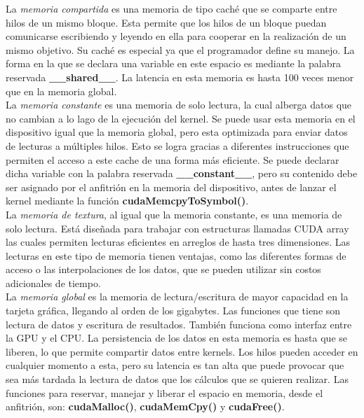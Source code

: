 La \textit{memoria compartida} es una memoria de tipo caché que se comparte entre hilos de un mismo bloque. Esta permite que los hilos de un bloque puedan comunicarse escribiendo y leyendo en ella para cooperar en la realización de un mismo objetivo. Su caché es especial ya que el programador define su manejo. La forma en la que se declara una variable en este espacio es mediante la palabra reservada \textbf{\_\_shared\_\_}. La latencia en esta memoria es hasta 100 veces menor que en la memoria global.\\
La \textit{memoria constante} es una memoria de solo lectura, la cual alberga datos que no cambian a lo lago de la ejecución del kernel. Se puede usar esta memoria en el dispositivo igual que la memoria global, pero esta optimizada para enviar datos de lecturas a múltiples hilos. Esto se logra gracias a diferentes instrucciones  que permiten el acceso a este cache de una forma más eficiente. Se puede declarar dicha variable con la palabra reservada \textbf{\_\_constant\_\_}, pero su contenido debe ser asignado por el anfitrión en la memoria del dispositivo, antes de lanzar el kernel mediante la función \textbf{cudaMemcpyToSymbol()}.\\
La \textit{memoria de textura}, al igual que la memoria constante, es una memoria de solo lectura. Está diseñada para trabajar con estructuras llamadas CUDA array las cuales permiten lecturas eficientes en arreglos de hasta tres dimensiones. Las lecturas en este tipo de memoria tienen ventajas, como las diferentes formas de acceso o las interpolaciones de los datos, que se pueden utilizar sin costos adicionales de tiempo.\\
La \textit{memoria global} es la memoria de lectura/escritura de mayor capacidad en la tarjeta gráfica, llegando al orden de los gigabytes. Las funciones que tiene son lectura de datos y escritura de resultados. También funciona como interfaz entre la GPU y el CPU. La persistencia de los datos en esta memoria es hasta que se liberen, lo que permite compartir datos entre kernels. Los hilos pueden acceder en cualquier momento a esta, pero su latencia es tan alta que puede provocar que sea más tardada la lectura de datos que los cálculos que se quieren realizar. Las funciones para reservar, manejar y liberar el espacio en memoria, desde el anfitrión, son: \textbf{cudaMalloc()}, \textbf{cudaMemCpy()} y \textbf{cudaFree()}.
